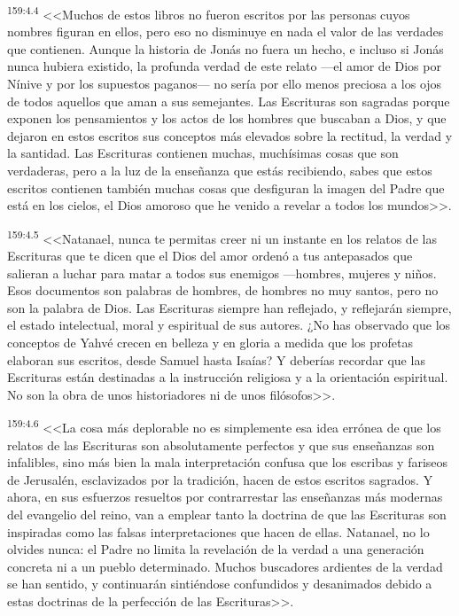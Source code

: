 \par 
\textsuperscript{159:4.4} <<Muchos de estos libros no fueron escritos por las personas cuyos nombres figuran en ellos, pero eso no disminuye en nada el valor de las verdades que contienen. Aunque la historia de Jonás no fuera un hecho, e incluso si Jonás nunca hubiera existido, la profunda verdad de este relato ---el amor de Dios por Nínive y por los supuestos paganos--- no sería por ello menos preciosa a los ojos de todos aquellos que aman a sus semejantes. Las Escrituras son sagradas porque exponen los pensamientos y los actos de los hombres que buscaban a Dios, y que dejaron en estos escritos sus conceptos más elevados sobre la rectitud, la verdad y la santidad. Las Escrituras contienen muchas, muchísimas cosas que son verdaderas, pero a la luz de la enseñanza que estás recibiendo, sabes que estos escritos contienen también muchas cosas que desfiguran la imagen del Padre que está en los cielos, el Dios amoroso que he venido a revelar a todos los mundos>>.

\par 
\textsuperscript{159:4.5} <<Natanael, nunca te permitas creer ni un instante en los relatos de las Escrituras que te dicen que el Dios del amor ordenó a tus antepasados que salieran a luchar para matar a todos sus enemigos ---hombres, mujeres y niños. Esos documentos son palabras de hombres, de hombres no muy santos, pero no son la palabra de Dios. Las Escrituras siempre han reflejado, y reflejarán siempre, el estado intelectual, moral y espiritual de sus autores. ¿No has observado que los conceptos de Yahvé crecen en belleza y en gloria a medida que los profetas elaboran sus escritos, desde Samuel hasta Isaías? Y deberías recordar que las Escrituras están destinadas a la instrucción religiosa y a la orientación espiritual. No son la obra de unos historiadores ni de unos filósofos>>.

\par 
\textsuperscript{159:4.6} <<La cosa más deplorable no es simplemente esa idea errónea de que los relatos de las Escrituras son absolutamente perfectos y que sus enseñanzas son infalibles, sino más bien la mala interpretación confusa que los escribas y fariseos de Jerusalén, esclavizados por la tradición, hacen de estos escritos sagrados. Y ahora, en sus esfuerzos resueltos por contrarrestar las enseñanzas más modernas del evangelio del reino, van a emplear tanto la doctrina de que las Escrituras son inspiradas como las falsas interpretaciones que hacen de ellas. Natanael, no lo olvides nunca: el Padre no limita la revelación de la verdad a una generación concreta ni a un pueblo determinado. Muchos buscadores ardientes de la verdad se han sentido, y continuarán sintiéndose confundidos y desanimados debido a estas doctrinas de la perfección de las Escrituras>>.

